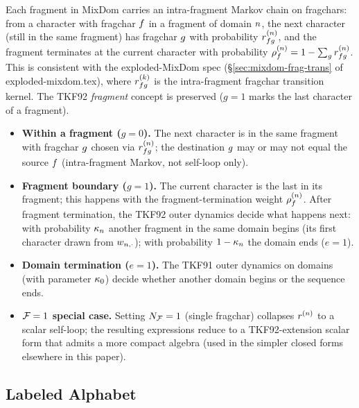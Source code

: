 \begin{remark}
\label{rem:mixdom-fragchars}
Each fragment in MixDom carries an intra-fragment Markov chain on
fragchars: from a character with fragchar $f$ in a fragment of
domain $n$, the next character (still in the same fragment) has
fragchar $g$ with probability $r^{(n)}_{fg}$,
and the fragment terminates at the current character with probability
$\rho^{(n)}_f = 1 - \sum_g r^{(n)}_{fg}$.
This is consistent with the exploded-MixDom spec
(\S\ref{sec:mixdom-frag-trans} of exploded-mixdom.tex), where
$r^{(k)}_{fg}$ is the intra-fragment fragchar transition kernel.
The TKF92 \emph{fragment} concept is preserved ($g=1$ marks the last
character of a fragment).

\begin{itemize}[nosep]
\item \textbf{Within a fragment ($g=0$).} The next character is in
the same fragment with fragchar $g$ chosen via
$r^{(n)}_{fg}$; the destination $g$ may
or may not equal the source $f$ (intra-fragment Markov, not
self-loop only).

\item \textbf{Fragment boundary ($g=1$).} The current character is the
last in its fragment; this happens with the fragment-termination
weight $\rho^{(n)}_f$. After fragment termination, the
TKF92 outer dynamics decide what happens next: with probability
$\kappa_n$ another fragment in the same domain begins (its first
character drawn from $w_{n, \cdot}$); with probability
$1-\kappa_n$ the domain ends ($e=1$).

\item \textbf{Domain termination ($e=1$).} The TKF91 outer dynamics
on domains (with parameter $\kappa_{0}$) decide whether another
domain begins or the sequence ends.

\item \textbf{$\mathcal{F} = 1$ special case.} Setting $N_{\mathcal{F}} = 1$
(single fragchar) collapses $r^{(n)}$ to a scalar self-loop;
the resulting expressions reduce to a TKF92-extension scalar form
that admits a more compact algebra (used in the simpler closed forms
elsewhere in this paper).
\end{itemize}
\end{remark}

\subsection{Labeled Alphabet}

